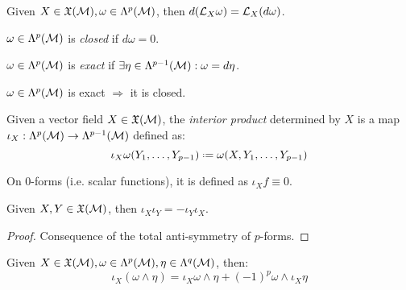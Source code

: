 \begin{propcorollary}
  Given $ X \in \mathfrak{X}(\mathcal{M}), \omega \in\Lambda^{p}(\mathcal{M}) $, then $ d(\mathcal{L}_X \omega) = \mathcal{L}_X (d\omega) $.
\end{propcorollary}

\begin{definition}
  $ \omega \in\Lambda^{p}(\mathcal{M}) $ is \textit{closed} if $ d\omega = 0 $.
\end{definition}
\begin{definition}
  $ \omega \in\Lambda^{p}(\mathcal{M}) $ is \textit{exact} if $ \exists \eta \in\Lambda^{p-1}(\mathcal{M}) : \omega = d\eta $.
\end{definition}

\begin{theorem}
  $ \omega \in\Lambda^{p}(\mathcal{M}) $ is exact $ \Rightarrow $ it is closed.
\end{theorem}

\begin{definition}
  Given a vector field $ X \in\mathfrak{X}(\mathcal{M}) $, the \textit{interior product} determined by $ X $ is a map $ \iota_X : \Lambda^{p}(\mathcal{M}) \rightarrow \Lambda^{p-1}(\mathcal{M}) $ defined as:
  \begin{equation}
    \iota_X \omega (Y_1, \dots, Y_{p-1}) \defeq \omega (X, Y_1, \dots, Y_{p-1})
    \label{eq:2.39}
  \end{equation}
\end{definition}

On 0-forms (i.e. scalar functions), it is defined as $ \iota_X f \equiv 0 $.

\begin{proposition}
  Given $ X,Y \in\mathfrak{X}(\mathcal{M}) $, then $ \iota_X \iota_Y = - \iota_Y \iota_X $.
\end{proposition}
\begin{proof}
  Consequence of the total anti-symmetry of $ p $-forms.
\end{proof}

\begin{proposition}
  Given $ X \in\mathfrak{X}(\mathcal{M}), \omega \in\Lambda^{p}(\mathcal{M}), \eta \in\Lambda^{q}(\mathcal{M}) $, then:
  \begin{equation}
    \iota_X (\omega \wedge \eta) = \iota_X \omega \wedge \eta + (-1)^p \omega \wedge \iota_X \eta
    \label{eq:2.40}
  \end{equation}
\end{proposition}

